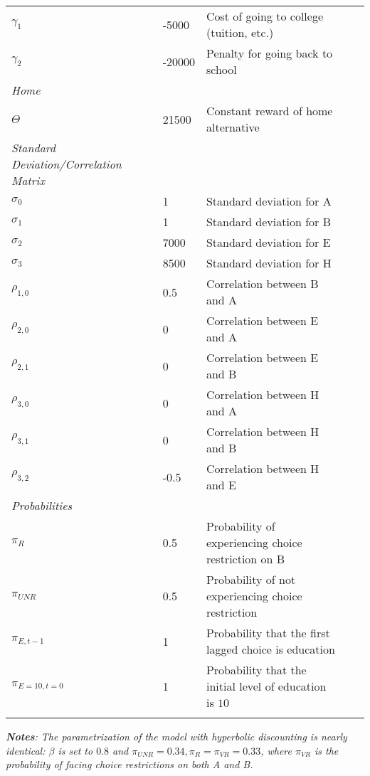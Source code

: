 \begin{longtable}{lllll}
$\gamma_1$								&          -5000 &          Cost of going to college (tuition, etc.) \\
$\gamma_2$				    			&         -20000 &          Penalty for going back to school \\
\addlinespace
\hline
\textit{Home}                           &                &          \\
\hline
$\Theta$								&          21500 &          Constant reward of home alternative \\
\addlinespace
\hline
\pagebreak
\textit{Standard Deviation/Correlation Matrix}           &          & \\
\hline
$\sigma_0$ 								&              1 &  		Standard deviation for A \\
$\sigma_1$  						    &              1 &  		Standard deviation for B \\
$\sigma_2$ 								&           7000 &  		Standard deviation for E \\
$\sigma_3$ 	                            &           8500 &  		Standard deviation for H \\
$\rho_{1,0}$							&            0.5 &  		Correlation between B and A \\
$\rho_{2,0}$						    &              0 &  		Correlation between E and A \\
$\rho_{2,1}$							&              0 &  		Correlation between E and B\\
$\rho_{3,0}$							&          	    0 &  		Correlation between H and A \\
$\rho_{3,1}$ 							&              0 &  		Correlation between H and B \\
$\rho_{3,2}$							&           -0.5 &  		Correlation between H and E \\
\addlinespace
\hline
\textit{Probabilities}                  &                &          \\
\hline
$\pi_R$ 								&         	 0.5 &     		Probability of experiencing choice restriction on B \\
$\pi_{UNR}$							    &    	     0.5 & 		 	Probability of not experiencing choice restriction \\
$\pi_{E,t-1}$						    &              1 &  		Probability that the first lagged choice is education \\
$\pi_{E=10,t=0}$					    &              1 &  		Probability that the initial level of education is $10$ \\
\hline
\label{tab:parametrization}
\end{longtable}
\footnotesize
\justify
\textit{\textbf{Notes}: The parametrization of the model with hyperbolic discounting is nearly identical: $\beta$ is set to $0.8$ and $\pi_{UNR} = 0.34, \pi_R = \pi_{VR} = 0.33$, where $\pi_{VR}$ is the probability of facing choice restrictions on both A and B.}



